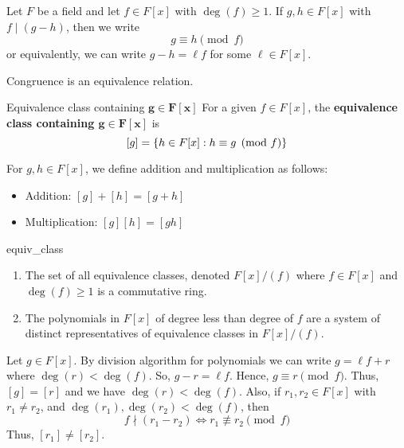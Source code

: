 \begin{Definition}{}{}
    Let $ F $ be a field and let $ f\in F[x] $ with $ \deg(f)\geqslant 1 $.
    If $ g,h\in F[x] $ with $ f\mid (g-h) $, then we write
    \[ g\equiv h \pmod{f} \]
    or equivalently, we can write $ g-h=\ell f $ for some $ \ell\in F[x] $.
\end{Definition}

\begin{Theorem}{}{}
    Congruence is an equivalence relation.
\end{Theorem}

\begin{Definition}{Equivalence class containing $\symbf{g\in F[x]}$}{}
    For a given $ f\in F[x] $, the \textbf{equivalence class containing $\symbf{g\in F[x]}$}
    is
    \[ [g]=\{h\in F[x]: h\equiv g\pmod{f}\} \]
\end{Definition}

\begin{Definition}{}{}
    For $ g,h\in F[x] $, we define addition and multiplication as follows:
    \begin{itemize}
        \item Addition: $ [g]+[h]=[g+h] $
        \item Multiplication: $ [g][h]=[gh] $
    \end{itemize}
\end{Definition}

\begin{Theorem}{}{equiv_class}
    \begin{enumerate}[label=(\arabic*)]
        \item The set of all equivalence classes, denoted $ F[x]/(f) $
              where $ f\in F[x] $ and $ \deg(f)\geqslant 1 $ is a
              commutative ring.
        \item The polynomials in $ F[x] $ of degree less than degree of $ f $
              are a system of distinct representatives of equivalence classes in
              $ F[x]/(f)$.
    \end{enumerate}
\end{Theorem}

\begin{Proof}{}{}
    Let $ g\in F[x] $. By division algorithm for polynomials we can write
    $ g=\ell f+r $ where $ \deg(r)<\deg(f) $. So, $ g-r=\ell f $. Hence,
    $ g\equiv r\pmod{f} $. Thus, $ [g]=[r] $ and we have $ \deg(r)<\deg(f) $.
    Also, if $ r_1,r_2\in F[x] $ with $ r_1\neq r_2 $, and
    $ \deg(r_1),\deg(r_2)<\deg(f) $, then
    \[ f\nmid (r_1-r_2)\iff r_1\not\equiv r_2\pmod{f} \]
    Thus, $ [r_1]\neq [r_2] $.
\end{Proof}
